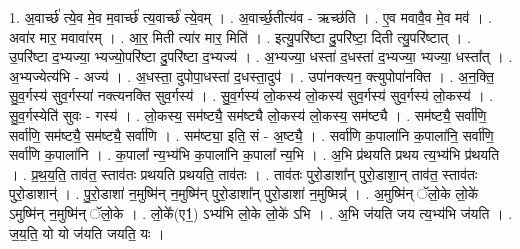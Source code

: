 \documentclass[17pt]{extarticle}
\begin{document}
1. अ॒वार्च्छ॑ त्ये॒व मे॒व म॒वार्च्छ॑ त्य॒वार्च्छ॑ त्ये॒वम् । . अ॒वार्च्छ॒तीत्य॑व - ऋच्छ॑ति । . ए॒व मवावै॒व मे॒व मव॑ । . अवा॑र मार॒ मवावा॑रम् । . आ॒र॒ मिती त्या॑र मार॒ मिति॑ । . इत्यु॒परि॑ष्टा दु॒परि॑ष्टा॒ दिती त्यु॒परि॑ष्टात् । . उ॒परि॑ष्टा द॒भ्यज्या॒ भ्यज्यो॒परि॑ष्टा दु॒परि॑ष्टा द॒भ्यज्य॑ । . अ॒भ्यज्या॒ धस्ता॑ द॒धस्ता॑ द॒भ्यज्या॒ भ्यज्या॒ धस्ता᳚त् । . अ॒भ्यज्येत्य॑भि - अज्य॑ । . अ॒धस्ता॒ दुपोपा॒धस्ता॑ द॒धस्ता॒दुप॑ । . उपा॑नक्त्यन॒ क्त्युपोपा॑नक्ति । . अ॒न॒क्ति॒ सु॒व॒र्गस्य॑ सुव॒र्गस्या॑ नक्त्यनक्ति सुव॒र्गस्य॑ । . सु॒व॒र्गस्य॑ लो॒कस्य॑ लो॒कस्य॑ सुव॒र्गस्य॑ सुव॒र्गस्य॑ लो॒कस्य॑ । . सु॒व॒र्गस्येति॑ सुवः - गस्य॑ । . लो॒कस्य॒ सम॑ष्ट्यै॒ सम॑ष्ट्यै लो॒कस्य॑ लो॒कस्य॒ सम॑ष्ट्यै । . सम॑ष्ट्यै॒ सर्वा॑णि॒ सर्वा॑णि॒ सम॑ष्ट्यै॒ सम॑ष्ट्यै॒ सर्वा॑णि । . सम॑ष्ट्या॒ इति॒ सं - अ॒ष्ट्यै॒ । . सर्वा॑णि क॒पाला॑नि क॒पाला॑नि॒ सर्वा॑णि॒ सर्वा॑णि क॒पाला॑नि । . क॒पाला᳚ न्य॒भ्य॑भि क॒पाला॑नि क॒पाला᳚ न्य॒भि । . अ॒भि प्र॑थयति प्रथय त्य॒भ्य॑भि प्र॑थयति । . प्र॒थ॒य॒ति॒ ताव॑त॒ स्ताव॑तः प्रथयति प्रथयति॒ ताव॑तः । . ताव॑तः पुरो॒डाशा᳚न् पुरो॒डाशा॒न् ताव॑त॒ स्ताव॑तः पुरो॒डाशान्॑ । . पु॒रो॒डाशा॑ न॒मुष्मि॑न् न॒मुष्मि॑न् पुरो॒डाशा᳚न् पुरो॒डाशा॑ न॒मुष्मिन्न्॑ । . अ॒मुष्मि॑न् ॅलो॒के लो॒के॑ ऽमुष्मि॑न् न॒मुष्मि॑न् ॅलो॒के । . लो॒के᳚(ए1॒) ऽभ्य॑भि लो॒के लो॒के॑ ऽभि । . अ॒भि ज॑यति जय त्य॒भ्य॑भि ज॑यति । . ज॒य॒ति॒ यो यो ज॑यति जयति॒ यः । \newline
\end{document}
